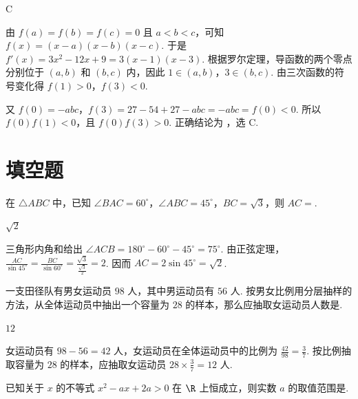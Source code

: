 \begin{answer}
C
\end{answer}

\begin{solution}
由 \(f(a)=f(b)=f(c)=0\) 且 \(a<b<c\)，可知
\(f(x)=(x-a)(x-b)(x-c)\). 于是 \(f'(x)=3x^2-12x+9=3(x-1)(x-3)\). 根据罗尔定理，导函数的两个零点分别位于 \((a,b)\) 和 \((b,c)\) 内，因此 \(1\in(a,b)\)，\(3\in(b,c)\). 由三次函数的符号变化得 \(f(1)>0\)，\(f(3)<0\).

又 \(f(0)=-abc\)，\(f(3)=27-54+27-abc=-abc=f(0)<0\). 所以 \(f(0)f(1)<0\)，且 \(f(0)f(3)>0\). 正确结论为 ，选 C.
\end{solution}

\section{填空题}

\begin{problem}
在 \(\triangle ABC\) 中，已知 \(\angle BAC = 60^{\circ}\)，\(\angle ABC = 45^{\circ}\)，\(BC = \sqrt{3}\)，则 \(AC =\)\fillinblank{}.
\end{problem}

\begin{answer}
\(\sqrt{2}\)
\end{answer}

\begin{solution}
三角形内角和给出 \(\angle ACB=180^{\circ}-60^{\circ}-45^{\circ}=75^{\circ}\). 由正弦定理，
\(\frac{AC}{\sin45^{\circ}}=\frac{BC}{\sin60^{\circ}}=\frac{\sqrt{3}}{\frac{\sqrt{3}}{2}}=2\). 因而 \(AC=2\sin45^{\circ}=\sqrt{2}\).
\end{solution}

\begin{problem}
一支田径队有男女运动员 \(98\text{ 人}\)，其中男运动员有 \(56\text{ 人}\). 按男女比例用分层抽样的方法，从全体运动员中抽出一个容量为 \(28\) 的样本，那么应抽取女运动员人数是\fillinblank{}.
\end{problem}

\begin{answer}
\(12\)
\end{answer}

\begin{solution}
女运动员有 \(98-56=42\) 人，女运动员在全体运动员中的比例为 \(\frac{42}{98}=\frac{3}{7}\). 按比例抽取容量为 \(28\) 的样本，应抽取女运动员 \(28\times\frac{3}{7}=12\) 人.
\end{solution}

\begin{problem}
已知关于 \(x\) 的不等式 \(x^{2} - ax + 2a > 0\) 在 \(\R\) 上恒成立，则实数 \(a\) 的取值范围是\fillinblank{}.
\end{problem}

